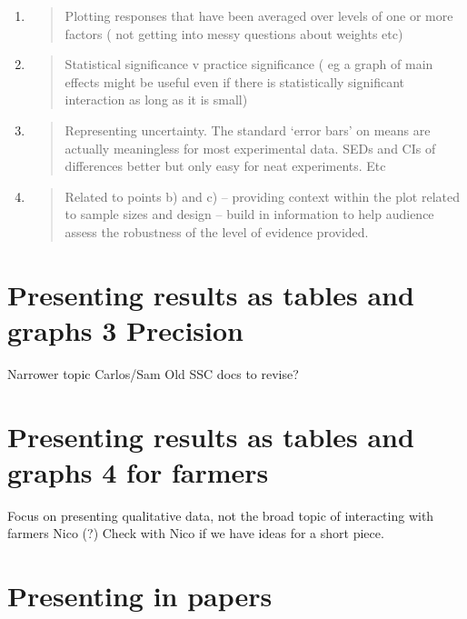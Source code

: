 \documentclass[
]{book}
\begin{document}
\begin{enumerate}
\def\labelenumi{\alph{enumi}.}
\item
  \begin{quote}
  Plotting responses that have been averaged over levels of one or more factors ( not getting into messy questions about weights etc)
  \end{quote}
\item
  \begin{quote}
  Statistical significance v practice significance ( eg a graph of main effects might be useful even if there is statistically significant interaction as long as it is small)
  \end{quote}
\item
  \begin{quote}
  Representing uncertainty. The standard `error bars' on means are actually meaningless for most experimental data. SEDs and CIs of differences better but only easy for neat experiments. Etc
  \end{quote}
\item
  \begin{quote}
  Related to points b) and c) -- providing context within the plot related to sample sizes and design -- build in information to help audience assess the robustness of the level of evidence provided.
  \end{quote}
\end{enumerate}

\hypertarget{precision}{%
\chapter{Presenting results as tables and graphs 3 Precision}\label{precision}}

Narrower topic Carlos/Sam Old SSC docs to revise?

\hypertarget{farmers}{%
\chapter{Presenting results as tables and graphs 4 for farmers}\label{farmers}}

Focus on presenting qualitative data, not the broad topic of interacting with farmers Nico (?) Check with Nico if we have ideas for a short piece.

\hypertarget{papers}{%
\chapter{Presenting in papers}\label{papers}}
\end{document}

